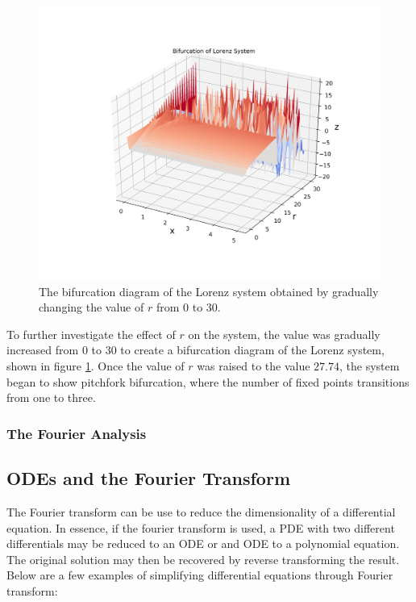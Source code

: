 \documentclass[twocolumn]{article}
\begin{document}
\begin{figure}
  \includegraphics[width=\linewidth]{bifurcation.png}
  \caption{
    The bifurcation diagram of the Lorenz system obtained by gradually changing
    the value of $r$ from $0$ to $30$.
  }
  \label{fig:bifurcation}
\end{figure}

To further investigate the effect of $r$ on the system, the value was gradually
increased from $0$ to $30$ to create a bifurcation diagram of the Lorenz system,
shown in figure \ref{fig:bifurcation}. Once the value of $r$ was raised to the
value $27.74$, the system began to show pitchfork bifurcation, where the number
of fixed points transitions from one to three.

\subsubsection{The Fourier Analysis}


\subsection{ODEs and the Fourier Transform}
The Fourier transform can be use to reduce the dimensionality of a differential equation. In essence, if the fourier transform is used, a PDE with two different differentials may be reduced to an ODE or and ODE to a polynomial equation. The original solution may then be recovered by reverse transforming the result. Below are a few examples of simplifying differential equations through Fourier transform:
\end{document}
